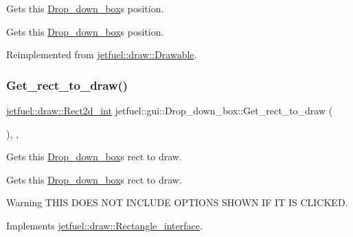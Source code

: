 Gets this \hyperlink{classjetfuel_1_1gui_1_1Drop__down__box}{Drop\+\_\+down\+\_\+box}\textquotesingle{}s position. 

Gets this \hyperlink{classjetfuel_1_1gui_1_1Drop__down__box}{Drop\+\_\+down\+\_\+box}\textquotesingle{}s position. 

Reimplemented from \hyperlink{classjetfuel_1_1draw_1_1Drawable_ae7ebd30d66db2c8a5d5371cbcf0023fc}{jetfuel\+::draw\+::\+Drawable}.

\mbox{\label{classjetfuel_1_1gui_1_1Drop__down__box_ab07ac526f3c2e9930398d78c7cad2d52}} 
\subsubsection{\texorpdfstring{Get\+\_\+rect\+\_\+to\+\_\+draw()}{Get\_rect\_to\_draw()}}
{\footnotesize\ttfamily \hyperlink{classjetfuel_1_1draw_1_1Rect2d}{jetfuel\+::draw\+::\+Rect2d\+\_\+int} jetfuel\+::gui\+::\+Drop\+\_\+down\+\_\+box\+::\+Get\+\_\+rect\+\_\+to\+\_\+draw (\begin{DoxyParamCaption}{ }\end{DoxyParamCaption})\hspace{0.3cm}{\ttfamily [inline]}, {\ttfamily [override]}, {\ttfamily [virtual]}}



Gets this \hyperlink{classjetfuel_1_1gui_1_1Drop__down__box}{Drop\+\_\+down\+\_\+box}\textquotesingle{}s rect to draw. 

Gets this \hyperlink{classjetfuel_1_1gui_1_1Drop__down__box}{Drop\+\_\+down\+\_\+box}\textquotesingle{}s rect to draw.

\begin{DoxyWarning}{Warning}
T\+H\+IS D\+O\+ES N\+OT I\+N\+C\+L\+U\+DE O\+P\+T\+I\+O\+NS S\+H\+O\+WN IF IT IS C\+L\+I\+C\+K\+ED. 
\end{DoxyWarning}


Implements \hyperlink{classjetfuel_1_1draw_1_1Rectangle__interface_a03fd3b6842ab7b3065379caec407296f}{jetfuel\+::draw\+::\+Rectangle\+\_\+interface}.

\mbox{\label{classjetfuel_1_1gui_1_1Drop__down__box_ab8beac8ed8b442d96723f72a2fe9edb6}} 
